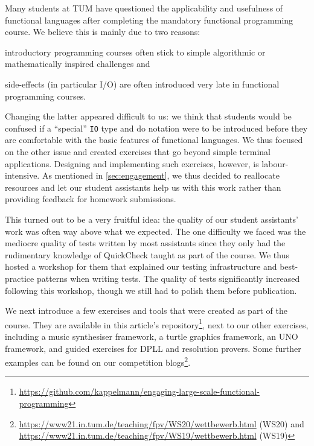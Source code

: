 Many students at TUM have questioned the
applicability and usefulness
of functional languages after completing
the mandatory functional programming course.
We believe this is mainly due to two reasons:
\begin{enumerate*}[label=\arabic*)]
  \item introductory programming courses often stick
to simple algorithmic or mathematically inspired challenges and
\item side-effects (in particular I/O)
are often introduced very late
in functional programming courses.
\end{enumerate*}

Changing the latter appeared difficult to us:
we think that students would be confused
if a ``special'' \texttt{IO} type and do notation were to
be introduced before they are comfortable
with the basic features of functional
languages.
We thus focused on the other issue
and created exercises that go beyond
simple terminal applications.
Designing and implementing such exercises,
however, is labour-intensive.
As mentioned in \cref{sec:engagement},
we thus decided to reallocate resources and
let our student assistants help us with this work
rather than providing feedback for homework submissions.

This turned out to be a very fruitful idea:
the quality of our student assistants' work was often way above what
we expected.
The one difficulty we faced was the mediocre quality of
tests written by most assistants
since they only had the rudimentary knowledge of QuickCheck taught as part of
the course.
We thus hosted a workshop for them that explained
our testing infrastructure and best-practice
patterns when writing tests.
The quality of tests significantly increased following this workshop,
though we still had to polish them before publication.

We next introduce a few exercises and tools
that were created as part of the course.
They are available in this article's repository\footnote{\url{https://github.com/kappelmann/engaging-large-scale-functional-programming}},
next to our other exercises, including
a music synthesiser framework,
a turtle graphics framework,
an UNO framework,
and guided exercises for DPLL and resolution provers.
Some further examples can be found on our competition blogs\footnote{\url{https://www21.in.tum.de/teaching/fpv/WS20/wettbewerb.html} (WS20) and
\url{https://www21.in.tum.de/teaching/fpv/WS19/wettbewerb.html} (WS19)}.

